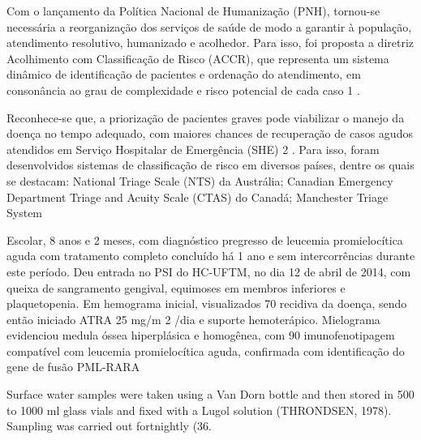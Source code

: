 \begin{multicols}{2}

\par{}Com o lançamento da Política Nacional de Humanização
(PNH), tornou-se necessária a reorganização dos serviços
de saúde de modo a garantir à população, atendimento
resolutivo, humanizado e acolhedor. Para isso, foi proposta a
diretriz Acolhimento com Classificação de Risco (ACCR), que
representa um sistema dinâmico de identificação de pacientes
e ordenação do atendimento, em consonância ao grau de
complexidade e risco potencial de cada caso 1 .
\par{}Reconhece-se que, a priorização de pacientes graves
pode viabilizar o manejo da doença no tempo adequado, com
maiores chances de recuperação de casos agudos atendidos
em Serviço Hospitalar de Emergência (SHE) 2 . Para isso, foram
desenvolvidos sistemas de classificação de risco em diversos
países, dentre os quais se destacam: National Triage Scale
(NTS) da Austrália; Canadian Emergency Department Triage
and Acuity Scale (CTAS) do Canadá; Manchester Triage System


\par{}Escolar, 8 anos e 2 meses, com diagnóstico pregresso
de leucemia promielocítica aguda com tratamento completo
concluído há 1 ano e sem intercorrências durante este período.
Deu entrada no PSI do HC-UFTM, no dia 12 de abril de
2014, com queixa de sangramento gengival, equimoses em
membros inferiores e plaquetopenia. Em hemograma inicial,
visualizados 70%
recidiva da doença, sendo então iniciado ATRA 25 mg/m 2 /dia
e suporte hemoterápico. Mielograma evidenciou medula
óssea hiperplásica e homogênea, com 90%
imunofenotipagem compatível com leucemia promielocítica
aguda, confirmada com identificação do gene de fusão
PML-RARA

\lipsum



\par{}Surface water samples were taken using a Van
Dorn bottle and then stored in 500 to 1000 ml glass
vials and fixed with a Lugol solution (THRONDSEN,
1978). Sampling was carried out fortnightly (36.

\lipsum
{}


\end{multicols}
